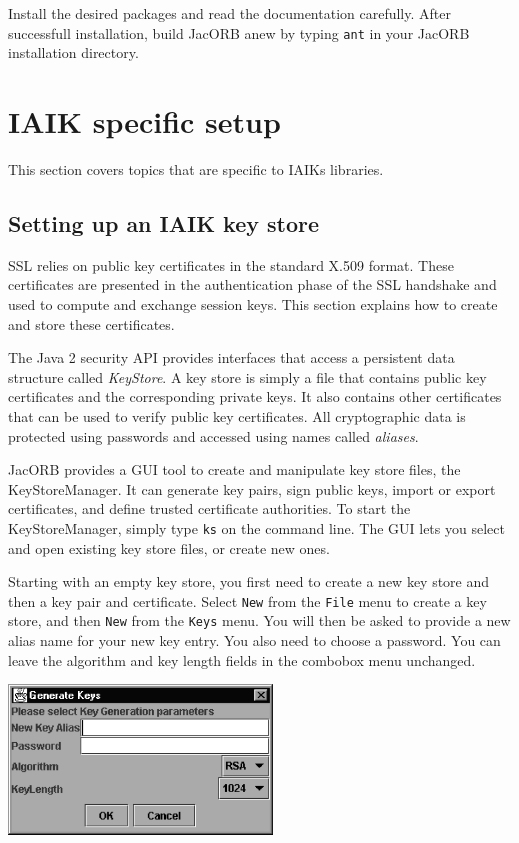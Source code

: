 Install the desired packages and read the documentation carefully. After
successfull installation, build JacORB anew by typing {\tt ant} in your JacORB
installation directory.


\section{IAIK specific setup}
This section covers topics that are specific to IAIKs libraries.

\subsection{Setting up an IAIK key store}

SSL  relies   on  public  key  certificates  in   the  standard  X.509
format. These  certificates are presented in  the authentication phase
of the  SSL handshake and used  to compute and  exchange session keys.
This section explains how to create and store these certificates.

The Java 2  security API provides interfaces that  access a persistent
data structure  called {\em  KeyStore}. A key  store is simply  a file
that contains  public key  certificates and the  corresponding private
keys. It also  contains other certificates that can  be used to verify
public key  certificates.  All  cryptographic data is  protected using
passwords and accessed using names called {\em aliases}.

JacORB provides a  GUI tool to create and  manipulate key store files,
the  KeyStoreManager. It  can generate  key pairs,  sign  public keys,
import  or   export  certificates,  and   define  trusted  certificate
authorities. To start the KeyStoreManager, simply type {\tt ks} on the
command  line. The GUI  lets you  select and  open existing  key store
files, or create new ones.

Starting with an  empty key store, you first need to  create a new key
store and then  a key pair and certificate. Select  {\tt New} from the
{\tt File}  menu to create  a key store,  and then {\tt New}  from the
{\tt Keys} menu.   You will then be asked to provide  a new alias name
for your  new key entry. You also  need to choose a  password. You can
leave  the  algorithm  and  key  length fields  in  the  combobox  menu
unchanged.

\bigskip
\begin{center}
  \includegraphics[width=7cm]{SSL/Generate}
\end{center}

